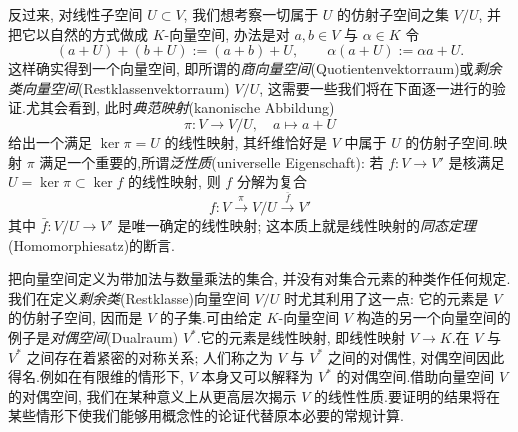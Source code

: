 \begin{center}
\end{center}

反过来, 对线性子空间 $U \subset V$, 我们想考察一切属于 $U$ 的仿射子空间之集 $V/U$, 并把它以自然的方式做成 $K$-向量空间, 办法是对 $a, b \in V$ 与 $\alpha \in K$ 令
\[
(a + U) + (b + U) := (a + b) + U, \qquad \alpha(a + U) := \alpha a + U\text{.}
\]
这样确实得到一个向量空间, 即所谓的\emph{商向量空间}(\textup{Quotientenvektorraum})或\emph{剩余类向量空间}(\textup{Restklassenvektorraum}) $V/U$, 这需要一些我们将在下面逐一进行的验证.尤其会看到, 此时\emph{典范映射}(\textup{kanonische Abbildung})
\[
\pi \colon V \longrightarrow V/U, \quad a \longmapsto a + U
\]
给出一个满足 $\ker \pi = U$ 的线性映射, 其纤维恰好是 $V$ 中属于 $U$ 的仿射子空间.映射 $\pi$ 满足一个重要的,所谓\emph{泛性质}(\textup{universelle Eigenschaft}): 若 $f \colon V \longrightarrow V'$ 是核满足 $U = \ker \pi \subset \ker f$ 的线性映射, 则 $f$ 分解为复合
\[
f \colon V \xrightarrow{\pi} V/U \xrightarrow{\bar{f}} V'
\]
其中 $\bar{f} \colon V/U \longrightarrow V'$ 是唯一确定的线性映射; 这本质上就是线性映射的\emph{同态定理}(\textup{Homomorphiesatz})的断言.

把向量空间定义为带加法与数量乘法的集合, 并没有对集合元素的种类作任何规定.我们在定义\emph{剩余类}(\textup{Restklasse})向量空间 $V/U$ 时尤其利用了这一点: 它的元素是 $V$ 的仿射子空间, 因而是 $V$ 的子集.可由给定 $K$-向量空间 $V$ 构造的另一个向量空间的例子是\emph{对偶空间}(\textup{Dualraum}) $V^*$.它的元素是线性映射, 即线性映射 $V \longrightarrow K$.在 $V$ 与 $V^*$ 之间存在着紧密的对称关系; 人们称之为 $V$ 与 $V^*$ 之间的对偶性, 对偶空间因此得名.例如在有限维的情形下, $V$ 本身又可以解释为 $V^*$ 的对偶空间.借助向量空间 $V$ 的对偶空间, 我们在某种意义上从更高层次揭示 $V$ 的线性性质.要证明的结果将在某些情形下使我们能够用概念性的论证代替原本必要的常规计算.


